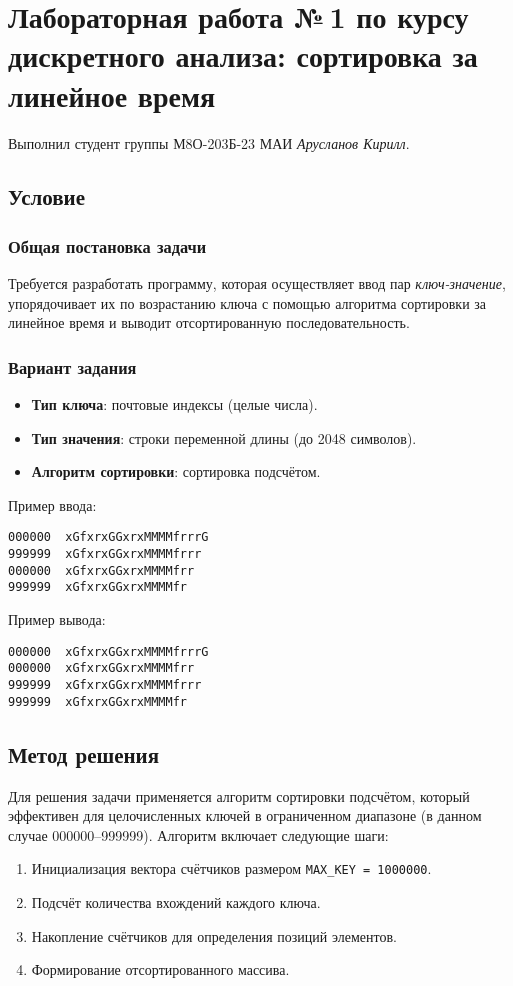 \documentclass[12pt]{article}
\begin{document}
\section*{Лабораторная работа №\,1 по курсу дискретного анализа: сортировка за линейное время}

Выполнил студент группы М8О-203Б-23 МАИ \textit{Арусланов Кирилл}.

\subsection*{Условие}

\subsubsection*{Общая постановка задачи}
Требуется разработать программу, которая осуществляет ввод пар \textit{ключ-значение}, упорядочивает их по возрастанию ключа с помощью алгоритма сортировки за линейное время и выводит отсортированную последовательность.

\subsubsection*{Вариант задания}
\begin{itemize}
    \item \textbf{Тип ключа}: почтовые индексы (целые числа).
    \item \textbf{Тип значения}: строки переменной длины (до 2048 символов).
    \item \textbf{Алгоритм сортировки}: сортировка подсчётом.
\end{itemize}

Пример ввода:
\begin{verbatim}
000000  xGfxrxGGxrxMMMMfrrrG
999999  xGfxrxGGxrxMMMMfrrr
000000  xGfxrxGGxrxMMMMfrr
999999  xGfxrxGGxrxMMMMfr
\end{verbatim}

Пример вывода:
\begin{verbatim}
000000  xGfxrxGGxrxMMMMfrrrG
000000  xGfxrxGGxrxMMMMfrr
999999  xGfxrxGGxrxMMMMfrrr
999999  xGfxrxGGxrxMMMMfr
\end{verbatim}

\subsection*{Метод решения}

Для решения задачи применяется алгоритм сортировки подсчётом, который эффективен для целочисленных ключей в ограниченном диапазоне (в данном случае 000000--999999). Алгоритм включает следующие шаги:
\begin{enumerate}
    \item Инициализация вектора счётчиков размером \texttt{MAX\_KEY = 1000000}.
    \item Подсчёт количества вхождений каждого ключа.
    \item Накопление счётчиков для определения позиций элементов.
    \item Формирование отсортированного массива.
\end{enumerate}
\end{document}
